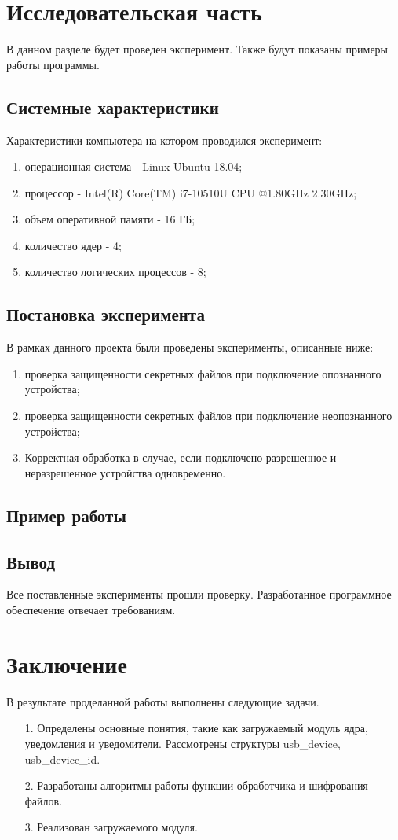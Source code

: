 \documentclass[a4paper, 10pt]{article}
\begin{document}
\clearpage
\newpage
\section{Исследовательская часть }
	\hspace*{5mm} В данном разделе будет проведен эксперимент. Также будут показаны примеры работы программы.
	\subsection{Системные характеристики}
	Характеристики компьютера на котором проводился эксперимент:
	\begin{enumerate}
		\item операционная система - Linux Ubuntu 18.04;
		\item процессор - Intel(R) Core(TM) i7-10510U CPU @1.80GHz 2.30GHz;
		\item объем оперативной памяти - 16 ГБ;
		\item количество ядер - 4;
		\item количество логических процессов - 8;
	\end{enumerate}
	\subsection{Постановка эксперимента}
	В рамках данного проекта были проведены эксперименты, описанные ниже:
	\begin{enumerate}
		\item проверка защищенности секретных файлов при подключение опознанного устройства;
		\item проверка защищенности секретных файлов при подключение неопознанного устройства;
		\item Корректная обработка в случае, если подключено разрешенное и неразрешенное устройства одновременно.
	\end{enumerate}
	\subsection{Пример работы}
	
	\subsection{Вывод}
	Все поставленные эксперименты прошли проверку. Разработанное программное обеспечение отвечает требованиям.
	\clearpage
\section*{Заключение}
	В результате проделанной работы выполнены следующие задачи.
	\begin{enumerate}
		\item[1. ] Определены основные понятия, такие как загружаемый модуль ядра, уведомления и уведомители. Рассмотрены структуры usb\_device, usb\_device\_id. 
		\item[2. ] Разработаны алгоритмы работы функции-обработчика и шифрования файлов. 
		\item[3. ] Реализован загружаемого модуля. 
	\end{enumerate}
	
\end{document}
